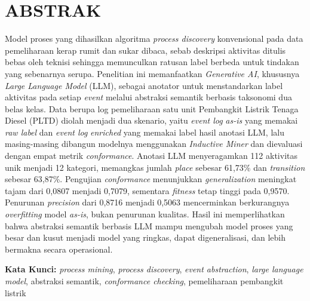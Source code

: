 \chapter*{ABSTRAK}

{\fontsize{11}{13.2}\selectfont
Model proses yang dihasilkan algoritma \textit{process discovery} konvensional pada data pemeliharaan kerap rumit dan sukar dibaca, sebab deskripsi aktivitas ditulis bebas oleh teknisi sehingga memunculkan ratusan label berbeda untuk tindakan yang sebenarnya serupa. Penelitian ini memanfaatkan \textit{Generative AI}, khususnya \textit{Large Language Model} (LLM), sebagai anotator untuk menstandarkan label aktivitas pada setiap \textit{event} melalui abstraksi semantik berbasis taksonomi dua belas kelas. Data berupa log pemeliharaan satu unit Pembangkit Listrik Tenaga Diesel (PLTD) diolah menjadi dua skenario, yaitu \textit{event log} \textit{as-is} yang memakai \textit{raw label} dan \textit{event log} \textit{enriched} yang memakai label hasil anotasi LLM, lalu masing-masing dibangun modelnya menggunakan \textit{Inductive Miner} dan dievaluasi dengan empat metrik \textit{conformance}. Anotasi LLM menyeragamkan 112 aktivitas unik menjadi 12 kategori, memangkas jumlah \textit{place} sebesar 61,73\% dan \textit{transition} sebesar 63,87\%. Pengujian \textit{conformance} menunjukkan \textit{generalization} meningkat tajam dari 0,0807 menjadi 0,7079, sementara \textit{fitness} tetap tinggi pada 0,9570. Penurunan \textit{precision} dari 0,8716 menjadi 0,5063 mencerminkan berkurangnya \textit{overfitting} model \textit{as-is}, bukan penurunan kualitas. Hasil ini memperlihatkan bahwa abstraksi semantik berbasis LLM mampu mengubah model proses yang besar dan kusut menjadi model yang ringkas, dapat digeneralisasi, dan lebih bermakna secara operasional.

\vspace{1cm}

\noindent\textbf{Kata Kunci:} \textit{process mining}, \textit{process discovery}, \textit{event abstraction}, \textit{large language model}, abstraksi semantik, \textit{conformance checking}, pemeliharaan pembangkit listrik
}
